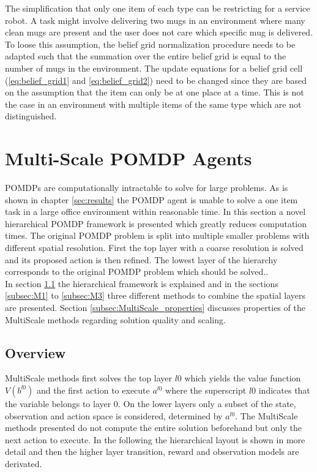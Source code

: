 The simplification that only one item of each type can be restricting for a service robot. A task might involve delivering two mugs in an environment where many clean mugs are present and the user does not care which specific mug is delivered. To loose this assumption, the belief grid normalization procedure needs to be adapted such that the summation over the entire belief grid is equal to the number of mugs in the environment. The update equations for a belief grid cell (\ref{eq:belief_grid1} and \ref{eq:belief_grid2}) need to be changed since they are based on the assumption that the item can only be at one place at a time. This is not the case in an environment with multiple items of the same type which are not distinguished. 
 
\section{Multi-Scale POMDP Agents}\label{sec:MultiScale}
POMDPs are computationally intractable to solve for large problems. As is shown in chapter \ref{sec:results} the POMDP agent is unable to solve a one item task in a large office environment within reasonable time. In this section a novel hierarchical POMDP framework is presented which greatly reduces computation times. The original POMDP problem is split into multiple smaller problems with different spatial resolution. First the top layer with a coarse resolution is solved and its proposed action is then refined. The lowest layer of the hierarchy corresponds to the original POMDP problem which should be solved..\\
In section \ref{subsec:MultiScale_overview} the hierarchical framework is explained and in the sections \ref{subsec:M1} to \ref{subsec:M3} three different methods to combine the spatial layers are presented. Section \ref{subsec:MultiScale_properties} discusses properties of the MultiScale methods regarding solution quality and scaling. 

\subsection{Overview} \label{subsec:MultiScale_overview}
MultiScale methods first solves the top layer $l0$ which yields the value function $V(b^{l0})$ and the first action to execute $a^{l0}$ where the superscript $l0$ indicates that the variable belongs to layer 0. On the lower layers only a subset of the state, observation and action space is considered, determined by $a^{l0}$. The MultiScale methods presented do not compute the entire solution beforehand but only the next action to execute. In the following the hierarchical layout is shown in more detail and then the higher layer transition, reward and observation models are derivated.

